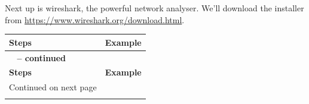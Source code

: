 \documentclass[11pt,a4paper]{report}
\begin{document}
\begin{flushleft}
            Next up is wireshark, the powerful network analyser. We'll download the installer from \href{https://www.wireshark.org/download.html}{https://www.wireshark.org/download.html}.
                \begin{center}
                    \begin{longtable}{ m{5cm} l }
                        \textbf{Steps} & \textbf{Example} \\
                        \hline
                        \endfirsthead
                        {{\bfseries \tablename\ \thetable{} -- continued}} \\
                        \textbf{Steps} & \textbf{Example} \\
                        \hline
                        \endhead
                        \hline Continued on next page \\
                        \endfoot
                        \endlastfoot


\end{longtable}
\end{center}
\end{flushleft}
\end{document}
